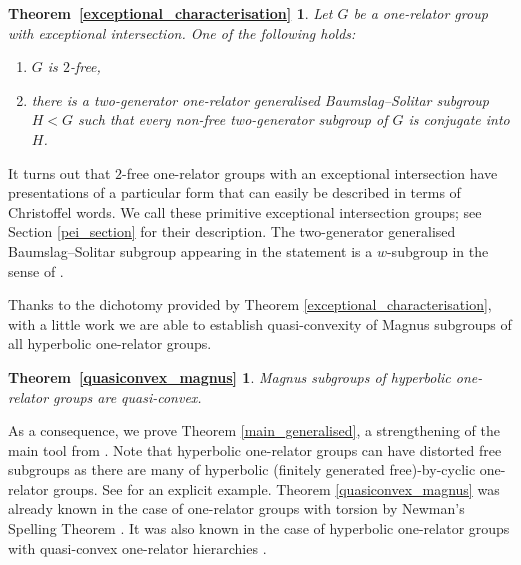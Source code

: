 \documentclass[11pt, a4paper]{amsart}
\theoremstyle{definition}
\newcommand{\fakeenv}{} %
\newenvironment{restate}[2]  %
{ 
 \renewcommand{\fakeenv}{#2} %
 \theoremstyle{plain} 
 \newtheorem*{\fakeenv}{#1~\ref{#2}} %
 \begin{\fakeenv}
}
{
 \end{\fakeenv}
}
\begin{document}
\begin{restate}{Theorem}{exceptional_characterisation}
Let $G$ be a one-relator group with exceptional intersection. One of the following holds:
\begin{enumerate}
\item\label{itm:not_neg} $G$ is $2$-free,
\item\label{itm:has_GBS} there is a two-generator one-relator generalised Baumslag--Solitar subgroup $H<G$ such that every non-free two-generator subgroup of $G$ is conjugate into $H$.
\end{enumerate}
\end{restate}

It turns out that $2$-free one-relator groups with an exceptional intersection have presentations of a particular form that can easily be described in terms of Christoffel words. We call these primitive exceptional intersection groups; see Section \ref{pei_section} for their description. The two-generator generalised Baumslag--Solitar subgroup appearing in the statement is a $w$-subgroup in the sense of \cite{louder_21}.

Thanks to the dichotomy provided by Theorem \ref{exceptional_characterisation}, with a little work we are able to establish quasi-convexity of Magnus subgroups of all hyperbolic one-relator groups.

\begin{restate}{Theorem}{quasiconvex_magnus}
Magnus subgroups of hyperbolic one-relator groups are quasi-convex.
\end{restate}

As a consequence, we prove Theorem \ref{main_generalised}, a strengthening of the main tool from \cite{me_22}. Note that hyperbolic one-relator groups can have distorted free subgroups as there are many of hyperbolic (finitely generated free)-by-cyclic one-relator groups. See \cite{kapovich_99} for an explicit example. Theorem \ref{quasiconvex_magnus} was already known in the case of one-relator groups with torsion by Newman's Spelling Theorem \cite{newman_68}. It was also known in the case of hyperbolic one-relator groups with quasi-convex one-relator hierarchies \cite{me_22}.
 
\end{document}
